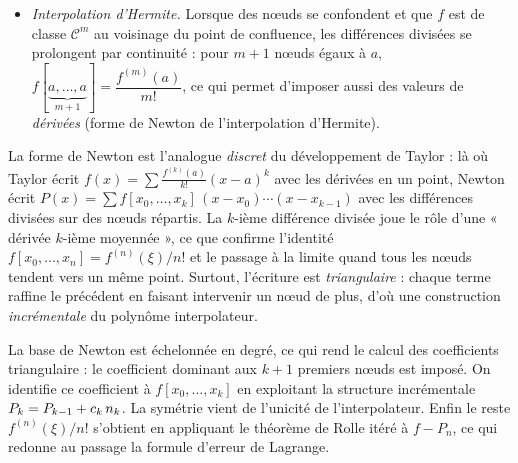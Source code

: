 \begin{tcolorbox}[thmbox]
\begin{itemize}
          existe $\xi \in I$ tel que
          \[
            \ddiv{x_0,\ldots,x_n} = \dfrac{f^{(n)}(\xi)}{n!}.
          \]
    \item \textit{Interpolation d'Hermite.}\enspace{}
          Lorsque des nœuds se confondent et que $f$ est de classe
          $\mathcal{C}^m$ au voisinage du point de confluence, les
          différences divisées se prolongent par continuité : pour $m+1$
          nœuds égaux à $a$,
          $f[\underbrace{a,\ldots,a}_{m+1}] = \dfrac{f^{(m)}(a)}{m!}$, ce
          qui permet d'imposer aussi des valeurs de \emph{dérivées} (forme
          de Newton de l'interpolation d'Hermite).
  \end{itemize}
\end{tcolorbox}

\begin{significationintuitive}
La forme de Newton est l'analogue \emph{discret} du développement de
Taylor : là où Taylor écrit $f(x)=\sum \tfrac{f^{(k)}(a)}{k!}(x-a)^k$ avec
les dérivées en un point, Newton écrit
$P(x)=\sum f[x_0,\ldots,x_k]\,(x-x_0)\cdots(x-x_{k-1})$ avec les
différences divisées sur des nœuds répartis. La $k$-ième différence
divisée joue le rôle d'une « dérivée $k$-ième moyennée », ce que confirme
l'identité $f[x_0,\ldots,x_n]=f^{(n)}(\xi)/n!$ et le passage à la limite
quand tous les nœuds tendent vers un même point. Surtout, l'écriture est
\emph{triangulaire} : chaque terme raffine le précédent en faisant
intervenir un nœud de plus, d'où une construction \emph{incrémentale} du
polynôme interpolateur.
\end{significationintuitive}

\decsep{}


\begin{ideepreuve}
La base de Newton est échelonnée en degré, ce qui rend le calcul des
coefficients triangulaire : le coefficient dominant aux $k+1$ premiers
nœuds est imposé. On identifie ce coefficient à $f[x_0,\ldots,x_k]$ en
exploitant la structure incrémentale $P_k = P_{k-1} + c_k\,n_{k}$. La
symétrie vient de l'unicité de l'interpolateur. Enfin le reste
$f^{(n)}(\xi)/n!$ s'obtient en appliquant le théorème de Rolle itéré à
$f-P_n$, ce qui redonne au passage la formule d'erreur de Lagrange.
\end{ideepreuve}

